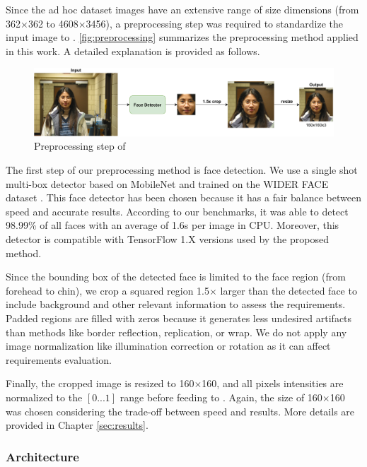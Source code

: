 Since the ad hoc dataset images have an extensive range of size dimensions (from 362$\times$362 to 4608$\times$3456), a preprocessing step was required to standardize the input image to \methodname. \autoref{fig:preprocessing} summarizes the preprocessing method applied in this work. A detailed explanation is provided as follows.

\begin{figure}
    \centering
    \includegraphics[width=\linewidth]{images/preprocessing.pdf}
    \caption{Preprocessing step of \methodname}
    \label{fig:preprocessing}
\end{figure}

The first step of our preprocessing method is face detection. We use a single shot multi-box detector based on MobileNet \citep{yeephycho} and trained on the WIDER FACE dataset \citep{yang2016wider}. This face detector has been chosen because it has a fair balance between speed and accurate results. According to our benchmarks, it was able to detect 98.99\% of all faces with an average of 1.6s per image in CPU. Moreover, this detector is compatible with TensorFlow 1.X versions used by the proposed method. 

Since the bounding box of the detected face is limited to the face region (from forehead to chin), we crop a squared region 1.5$\times$ larger than the detected face to include background and other relevant information to assess the requirements. Padded regions are filled with zeros because it generates less undesired artifacts than methods like border reflection, replication, or wrap. We do not apply any image normalization like illumination correction or rotation as it can affect requirements evaluation. 

Finally, the cropped image is resized to 160$\times$160, and all pixels intensities are normalized to the $[0...1]$ range before feeding to \methodname. Again, the size of 160$\times$160 was chosen considering the trade-off between speed and results. More details are provided in Chapter \ref{sec:results}. 

\subsubsection{Architecture}

